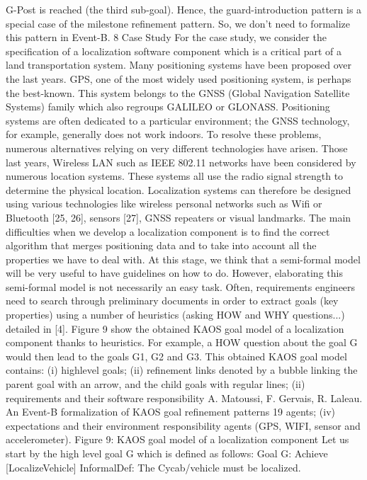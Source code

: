 G-Post is reached (the third sub-goal). Hence, the guard-introduction pattern is a special
case of the milestone refinement pattern. So, we don’t need to formalize this pattern in
Event-B.
8 Case Study
For the case study, we consider the specification of a localization software component which is
a critical part of a land transportation system. Many positioning systems have been proposed
over the last years. GPS, one of the most widely used positioning system, is perhaps the
best-known. This system belongs to the GNSS (Global Navigation Satellite Systems) family
which also regroups GALILEO or GLONASS. Positioning systems are often dedicated to a
particular environment; the GNSS technology, for example, generally does not work indoors.
To resolve these problems, numerous alternatives relying on very different technologies have
arisen. Those last years, Wireless LAN such as IEEE 802.11 networks have been considered by
numerous location systems. These systems all use the radio signal strength to determine the
physical location. Localization systems can therefore be designed using various technologies
like wireless personal networks such as Wifi or Bluetooth [25, 26], sensors [27], GNSS repeaters
or visual landmarks.
The main difficulties when we develop a localization component is to find the correct
algorithm that merges positioning data and to take into account all the properties we have
to deal with. At this stage, we think that a semi-formal model will be very useful to have
guidelines on how to do. However, elaborating this semi-formal model is not necessarily an
easy task. Often, requirements engineers need to search through preliminary documents in
order to extract goals (key properties) using a number of heuristics (asking HOW and WHY
questions...) detailed in [4]. Figure 9 show the obtained KAOS goal model of a localization
component thanks to heuristics. For example, a HOW question about the goal G would
then lead to the goals G1, G2 and G3. This obtained KAOS goal model contains: (i) highlevel goals; (ii) refinement links denoted by a bubble linking the parent goal with an arrow,
and the child goals with regular lines; (ii) requirements and their software responsibility
A. Matoussi, F. Gervais, R. Laleau. An Event-B formalization of KAOS goal refinement patterns 19
agents; (iv) expectations and their environment responsibility agents (GPS, WIFI, sensor
and accelerometer).
Figure 9: KAOS goal model of a localization component
Let us start by the high level goal G which is defined as follows:
Goal G: Achieve [LocalizeVehicle]
InformalDef: The Cycab/vehicle must be localized.
